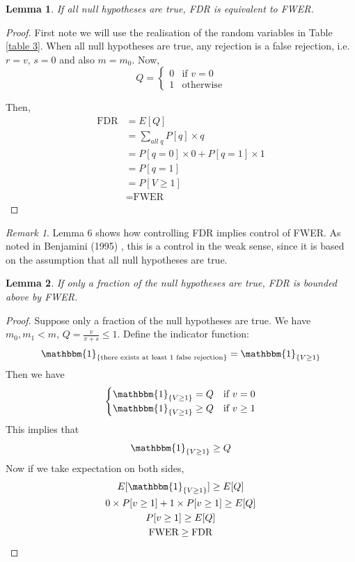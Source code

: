 \documentclass[12pt]{article}
\theoremstyle{plain}
\newtheorem{lemma}{Lemma}
\theoremstyle{definition}
\theoremstyle{remark}
\newtheorem*{remark}{Remark}
\begin{document}
\begin{lemma}
If all null hypotheses are true, FDR is equivalent to FWER. \cite{5.7}
\end{lemma}

\begin{proof} \cite{5.3}
First note we will use the realisation of the random variables in Table \ref{table 3}. When all null hypotheses are true, any rejection is a false rejection, i.e. $r=v$, $s=0$ and also $m=m_0$. Now, 
\begin{equation*}
  Q=
    \begin{cases}
    0&\text{if $v=0$}\\
    1&\text{otherwise}
    \end{cases}
\end{equation*}

Then,
\begin{align*}
    \text{FDR}&=E[Q]\\
    &=\sum_{all\;q}P[q]\times q\\
    &=P[q=0]\times0+P[q=1]\times1\\
    &=P[q=1]\\
    &=P[V\ge 1]\\
    &=\text{FWER}
\end{align*}
\end{proof}

\begin{remark}
Lemma 6 shows how controlling FDR implies control of FWER. As noted in Benjamini (1995) \cite{5.7}, this is a control in the weak sense, since it is based on the assumption that all null hypotheses are true.
\end{remark}

\begin{lemma}
If only a fraction of the null hypotheses are true, FDR is bounded above by FWER. \cite{5.7}
\end{lemma}

\begin{proof} \cite{5.3}
Suppose only a fraction of the null hypotheses are true. We have $m_0, m_1<m$, $Q=\frac{v}{v+s}\leq1$. Define the indicator function:
\[\mathbbm{1}_{\{\text{there exists at least 1 false rejection}\}}=\mathbbm{1}_{\{V\ge1\}}\]
Then we have
\begin{equation*}
    \begin{cases}
    \mathbbm{1}_{\{V\ge1\}}=Q & \text{if $v=0$}\\
    \mathbbm{1}_{\{V\ge1\}}\ge Q & \text{if $v\ge1$}
    \end{cases}
\end{equation*}
This implies that\[\mathbbm{1}_{\{V\ge1\}}\ge Q\]
Now if we take expectation on both sides,
\begin{gather*}
    E[\mathbbm{1}_{\{V\ge1\}}]\ge E[Q]\\
    0\times P[v\ge1]+1\times P[v\ge1]\ge E[Q]\\
    P[v\ge1]\ge E[Q]\\
    \text{FWER}\ge \text{FDR}
\end{gather*}
\end{proof}
\end{document}
